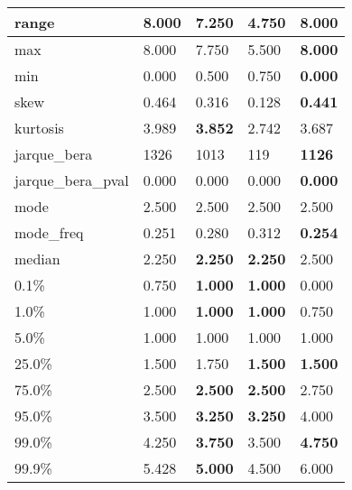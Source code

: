 \begin{table}[H]
\begin{tabular}{|l|m{10em}|m{10em}|m{10em}|m{10em}|}
\hline range & 8.000 & 7.250 & \cellcolor[rgb]{0.9, 0.54, 0.52} 4.750 & \bfseries 8.000 \\
\hline max & 8.000 & 7.750 & \cellcolor[rgb]{0.9, 0.54, 0.52} 5.500 & \bfseries 8.000 \\
\hline min & 0.000 & 0.500 & \cellcolor[rgb]{0.9, 0.54, 0.52} 0.750 & \bfseries 0.000 \\
\hline skew & 0.464 & 0.316 & \cellcolor[rgb]{0.9, 0.54, 0.52} 0.128 & \bfseries 0.441 \\
\hline kurtosis & 3.989 & \bfseries 3.852 & \cellcolor[rgb]{0.9, 0.54, 0.52} 2.742 & 3.687 \\
\hline jarque\_bera & 1326 & 1013 & \cellcolor[rgb]{0.9, 0.54, 0.52} 119 & \bfseries 1126 \\
\hline jarque\_bera\_pval & 0.000 & 0.000 & \cellcolor[rgb]{0.9, 0.54, 0.52} 0.000 & \bfseries 0.000 \\
\hline mode & 2.500 & 2.500 & 2.500 & 2.500 \\
\hline mode\_freq & 0.251 & 0.280 & \cellcolor[rgb]{0.9, 0.54, 0.52} 0.312 & \bfseries 0.254 \\
\hline median & 2.250 & \bfseries 2.250 & \bfseries 2.250 & \cellcolor[rgb]{0.9, 0.54, 0.52} 2.500 \\
\hline 0.1\% & 0.750 & \bfseries 1.000 & \bfseries 1.000 & \cellcolor[rgb]{0.9, 0.54, 0.52} 0.000 \\
\hline 1.0\% & 1.000 & \bfseries 1.000 & \bfseries 1.000 & \cellcolor[rgb]{0.9, 0.54, 0.52} 0.750 \\
\hline 5.0\% & 1.000 & 1.000 & 1.000 & 1.000 \\
\hline 25.0\% & 1.500 & \cellcolor[rgb]{0.9, 0.54, 0.52} 1.750 & \bfseries 1.500 & \bfseries 1.500 \\
\hline 75.0\% & 2.500 & \bfseries 2.500 & \bfseries 2.500 & \cellcolor[rgb]{0.9, 0.54, 0.52} 2.750 \\
\hline 95.0\% & 3.500 & \bfseries 3.250 & \bfseries 3.250 & \cellcolor[rgb]{0.9, 0.54, 0.52} 4.000 \\
\hline 99.0\% & 4.250 & \bfseries 3.750 & \cellcolor[rgb]{0.9, 0.54, 0.52} 3.500 & \bfseries 4.750 \\
\hline 99.9\% & 5.428 & \bfseries 5.000 & \cellcolor[rgb]{0.9, 0.54, 0.52} 4.500 & 6.000 \\
\hline
\end{tabular}
\end{table}
